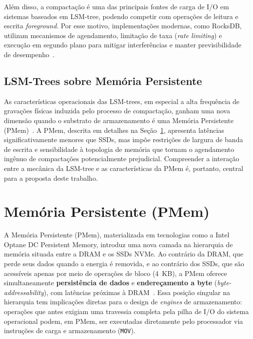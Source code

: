 Além disso, a compactação é uma das principais fontes de carga de I/O em sistemas
baseados em LSM-tree, podendo competir com operações de leitura e escrita
\textit{foreground}. Por esse motivo, implementações modernas, como RocksDB, utilizam
mecanismos de agendamento, limitação de taxa (\textit{rate limiting}) e execução
em segundo plano para mitigar interferências e manter previsibilidade de
desempenho~\cite{rocksdb}.

\subsection*{LSM-Trees sobre Memória Persistente}

As características operacionais das LSM-trees, em especial a alta frequência de
gravações físicas induzida pelo processo de compactação, ganham uma nova dimensão
quando o substrato de armazenamento é uma Memória Persistente
(PMem)~\cite{revisting_design_lsm,FlatLSM,SLM-DB}. A PMem, descrita em detalhes
na Seção~\ref{sec:pmem}, apresenta latências significativamente menores que SSDs,
mas impõe restrições de largura de banda de escrita e sensibilidade à topologia de
memória que tornam o agendamento ingênuo de compactações potencialmente prejudicial.
Compreender a interação entre a mecânica da LSM-tree e as características da PMem
é, portanto, central para a proposta deste trabalho.

\section{Memória Persistente (PMem)}
\label{sec:pmem}

A Memória Persistente (PMem), materializada em tecnologias como a Intel Optane DC
Persistent Memory, introduz uma nova camada na hierarquia de memória situada entre
a DRAM e os SSDs NVMe. Ao contrário da DRAM, que perde seus dados quando a energia
é removida, e ao contrário dos SSDs, que são acessíveis apenas por meio de
operações de bloco (4~KB), a PMem oferece simultaneamente \textbf{persistência de
dados} e \textbf{endereçamento a byte} (\textit{byte-addressability}), com latências
próximas à DRAM~\cite{van_renen_2020}. Essa posição singular na hierarquia tem
implicações diretas para o design de \textit{engines} de armazenamento: operações
que antes exigiam uma travessia completa pela pilha de I/O do sistema operacional
podem, em PMem, ser executadas diretamente pelo processador via instruções de carga
e armazenamento (\texttt{MOV}).


